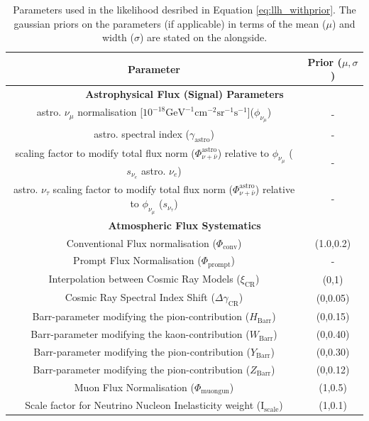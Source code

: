 \begin{table}[h]
    \caption{Parameters used in the likelihood desribed in Equation \ref{eq:llh_withprior}. The gaussian priors on the parameters (if applicable) in terms of the mean ($\mu$) and width ($\sigma$) are stated on the alongside.}
    
    \begin{tabular}{ |c |c|}
        \hline
        Parameter & Prior ($\mu,\sigma$)\\
        \hline
        \hline
        \multicolumn{2}{c}{\textbf{Astrophysical Flux (Signal) Parameters}}\\
        \hline
        astro. $\nu_{\mu}$ normalisation [$10^{-18} \mathrm{GeV}^{-1}\mathrm{cm}^{-2}\mathrm{sr}^{-1}\mathrm{s}^{-1}$]($\phi_{\nu_{\mu}}$) & - \\
        astro. spectral index ($\gamma_{\mathrm{astro}}$) & -\\
        scaling factor to modify total flux norm ($\Phi_{\nu+\bar\nu}^{\mathrm{astro}}$) relative to $\phi_{\nu_{\mu}}$ ($s_{\nu_e}$ astro. $\nu_{e}$)&- \\
        astro. $\nu_{\tau}$ scaling factor to modify total flux norm ($\Phi_{\nu+\bar\nu}^{\mathrm{astro}}$) relative to $\phi_{\nu_{\mu}}$ ($s_{\nu_{\tau}}$) & -\\
        \hline
        \multicolumn{2}{c}{\textbf{Atmospheric Flux Systematics}}\\
        \hline
        Conventional Flux normalisation ($\Phi_{\mathrm{conv}}$)  & (1.0,0.2)\\
        Prompt Flux Normalisation ($\Phi_{\mathrm{prompt}}$) &  - \\
        Interpolation between Cosmic Ray Models ($\xi_{\mathrm{CR}}$)  & (0,1)\\
        Cosmic Ray Spectral Index Shift ($\Delta\gamma_{\mathrm{CR}}$) &  (0,0.05)\\
        Barr-parameter modifying the pion-contribution ($H_{\mathrm{Barr}}$) & (0,0.15)\\
        Barr-parameter modifying the kaon-contribution ($W_{\mathrm{Barr}}$) & (0,0.40)\\
        Barr-parameter modifying the pion-contribution ($Y_{\mathrm{Barr}}$)& (0,0.30)\\
        Barr-parameter modifying the pion-contribution ($Z_{\mathrm{Barr}}$) & (0,0.12)\\
        Muon Flux Normalisation ($\Phi_{\mathrm{muongun}}$)  & (1,0.5)\\
        Scale factor for Neutrino Nucleon Inelasticity weight ($\mathrm{I}_{\mathrm{scale}}$) & (1,0.1)\\
        \hline
        

\end{tabular}
\end{table}
